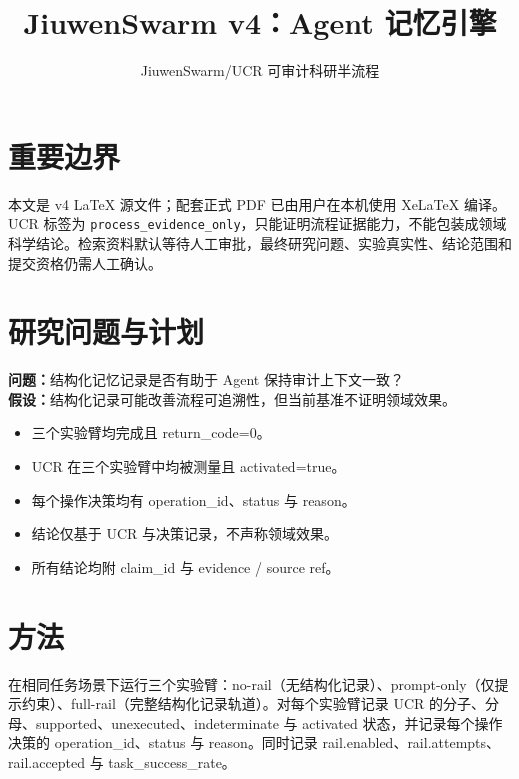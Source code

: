 \documentclass[UTF8]{ctexart}
\title{JiuwenSwarm v4：Agent 记忆引擎}
\author{JiuwenSwarm/UCR 可审计科研半流程}
\date{}
\begin{document}
\maketitle
\section{重要边界}
本文是 v4 LaTeX 源文件；配套正式 PDF 已由用户在本机使用 XeLaTeX 编译。UCR 标签为 \texttt{process\_evidence\_only}，只能证明流程证据能力，不能包装成领域科学结论。检索资料默认等待人工审批，最终研究问题、实验真实性、结论范围和提交资格仍需人工确认。
\section{研究问题与计划}
\textbf{问题：}结构化记忆记录是否有助于 Agent 保持审计上下文一致？\\
\textbf{假设：}结构化记录可能改善流程可追溯性，但当前基准不证明领域效果。
\begin{itemize}
\item 三个实验臂均完成且 return\_\allowbreak{}code=0。
\item UCR 在三个实验臂中均被测量且 activated=true。
\item 每个操作决策均有 operation\_\allowbreak{}id、status 与 reason。
\item 结论仅基于 UCR 与决策记录，不声称领域效果。
\item 所有结论均附 claim\_\allowbreak{}id 与 evidence / source ref。
\end{itemize}
\section{方法}
在相同任务场景下运行三个实验臂：no-\allowbreak{}rail（无结构化记录）、prompt-\allowbreak{}only（仅提示约束）、full-\allowbreak{}rail（完整结构化记录轨道）。对每个实验臂记录 UCR 的分子、分母、supported、unexecuted、indeterminate 与 activated 状态，并记录每个操作决策的 operation\_\allowbreak{}id、status 与 reason。同时记录 rail.enabled、rail.attempts、rail.accepted 与 task\_\allowbreak{}success\_\allowbreak{}rate。
\end{document}
